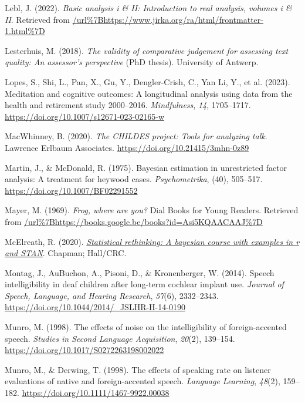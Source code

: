 \documentclass[
]{agujournal2019}
\newlength{\cslhangindent}
\newenvironment{CSLReferences}[2] %
 {\begin{list}{}{%
  \setlength{\itemindent}{0pt}
  \setlength{\leftmargin}{0pt}
  \setlength{\parsep}{0pt}
  \ifodd #1
   \setlength{\leftmargin}{\cslhangindent}
   \setlength{\itemindent}{-1\cslhangindent}
  \fi
  \setlength{\itemsep}{#2\baselineskip}}}
 {\end{list}}
\begin{document}
\begin{CSLReferences}{1}{0}
Lebl, J. (2022). \emph{Basic analysis i \& II: Introduction to real
analysis, volumes i \& II}. Retrieved from
\url{/url\%7Bhttps://www.jirka.org/ra/html/frontmatter-1.html\%7D}

Lesterhuis, M. (2018). \emph{The validity of comparative judgement for
assessing text quality: An assessor's perspective} (PhD thesis).
University of Antwerp.

Lopes, S., Shi, L., Pan, X., Gu, Y., Dengler-Crish, C., Yan Li, Y., et
al. (2023). Meditation and cognitive outcomes: A longitudinal analysis
using data from the health and retirement study 2000--2016.
\emph{Mindfulness}, \emph{14}, 1705--1717.
\url{https://doi.org/10.1007/s12671-023-02165-w}

MacWhinney, B. (2020). \emph{The CHILDES project: Tools for analyzing
talk}. Lawrence Erlbaum Associates.
\url{https://doi.org/10.21415/3mhn-0z89}

Martin, J., \& McDonald, R. (1975). Bayesian estimation in unrestricted
factor analysis: A treatment for heywood cases. \emph{Psychometrika},
(40), 505--517. \url{https://doi.org/10.1007/BF02291552}

Mayer, M. (1969). \emph{Frog, where are you?} Dial Books for Young
Readers. Retrieved from
\url{/url\%7Bhttps://books.google.be/books?id=Asi5KQAACAAJ\%7D}

McElreath, R. (2020). \emph{\href{}{Statistical rethinking: A bayesian
course with examples in r and STAN}}. Chapman; Hall/CRC.

Montag, J., AuBuchon, A., Pisoni, D., \& Kronenberger, W. (2014). Speech
intelligibility in deaf children after long-term cochlear implant use.
\emph{Journal of Speech, Language, and Hearing Research}, \emph{57}(6),
2332--2343. \url{https://doi.org/10.1044/2014/_JSLHR-H-14-0190}

Munro, M. (1998). The effects of noise on the intelligibility of
foreign-accented speech. \emph{Studies in Second Language Acquisition},
\emph{20}(2), 139--154. \url{https://doi.org/10.1017/S0272263198002022}

Munro, M., \& Derwing, T. (1998). The effects of speaking rate on
listener evaluations of native and foreign-accented speech.
\emph{Language Learning}, \emph{48}(2), 159--182.
\url{https://doi.org/10.1111/1467-9922.00038}


\end{CSLReferences}
\end{document}
